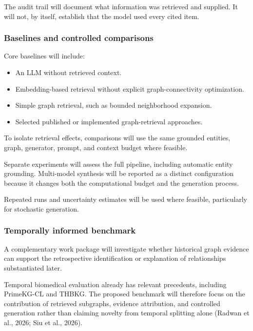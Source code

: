 The audit trail will document what information was retrieved and supplied. It will not, by itself, establish that the model used every cited item.



\subsubsection{Baselines and controlled comparisons}\label{baselines-and-controlled-comparisons}

Core baselines will include:

\begin{itemize}
\tightlist
\item
  An LLM without retrieved context.
\item
  Embedding-based retrieval without explicit graph-connectivity optimization.
\item
  Simple graph retrieval, such as bounded neighborhood expansion.
\item
  Selected published or implemented graph-retrieval approaches.
\end{itemize}

To isolate retrieval effects, comparisons will use the same grounded entities, graph, generator, prompt, and context budget where feasible.

Separate experiments will assess the full pipeline, including automatic entity grounding. Multi-model synthesis will be reported as a distinct configuration because it changes both the computational budget and the generation process.

Repeated runs and uncertainty estimates will be used where feasible, particularly for stochastic generation.

\subsubsection{Temporally informed benchmark}\label{temporally-informed-benchmark}

A complementary work package will investigate whether historical graph evidence can support the retrospective identification or explanation of relationships substantiated later.

Temporal biomedical evaluation already has relevant precedents, including PrimeKG-CL and THBKG. The proposed benchmark will therefore focus on the contribution of retrieved subgraphs, evidence attribution, and controlled generation rather than claiming novelty from temporal splitting alone (Radwan et al., 2026; Siu et al., 2026).

